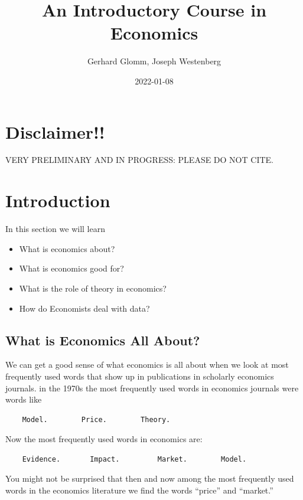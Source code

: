 \documentclass[
]{book}
\title{An Introductory Course in Economics}
\author{Gerhard Glomm, Joseph Westenberg}
\date{2022-01-08}
\providecommand{\tightlist}{%
  \setlength{\itemsep}{0pt}\setlength{\parskip}{0pt}}
\begin{document}
\maketitle

{
\setcounter{tocdepth}{1}
\tableofcontents
}
\hypertarget{disclaimer}{%
\chapter{Disclaimer!!}\label{disclaimer}}

VERY PRELIMINARY AND IN PROGRESS: PLEASE DO NOT CITE.

\hypertarget{intro}{%
\chapter{Introduction}\label{intro}}

In this section we will learn

\begin{itemize}
\tightlist
\item
  What is economics about?
\item
  What is economics good for?
\item
  What is the role of theory in economics?
\item
  How do Economists deal with data?
\end{itemize}

\hypertarget{what-is-economics-all-about}{%
\section{What is Economics All About?}\label{what-is-economics-all-about}}

We can get a good sense of what economics is all about when we look at most frequently used words that show up in publications in scholarly economics journals. in the 1970s the most frequently used words in economics journals were words like

\begin{verbatim}
    Model.        Price.        Theory.
\end{verbatim}

Now the most frequently used words in economics are:

\begin{verbatim}
    Evidence.       Impact.         Market.        Model.
\end{verbatim}

You might not be surprised that then and now among the most frequently used words in the economics literature we find the words ``price'' and ``market.''
\end{document}
